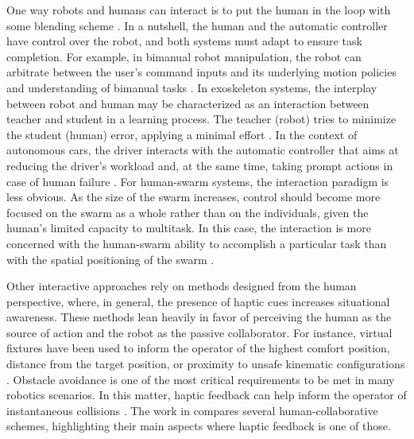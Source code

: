 One way robots and humans can interact is to put the human in the loop with some blending scheme \cite{amirshirzad2019}. In a nutshell, the human and the automatic controller have control over the robot, and both systems must adapt to ensure task completion. For example, in bimanual robot manipulation, the robot can arbitrate between the user's command inputs and its underlying motion policies and understanding of bimanual tasks \cite{rakita2019, xi2019}. In exoskeleton systems, the interplay between robot and human may be characterized as an interaction between teacher and student in a learning process. The teacher (robot) tries to minimize the student (human) error, applying a minimal effort \cite{bao2020, santos2019}. In the context of autonomous cars, the driver interacts with the automatic controller that aims at reducing the driver's workload and, at the same time, taking prompt actions in case of human failure \cite{huang2019, lu2019}. For human-swarm systems, the interaction paradigm is less obvious. As the size of the swarm increases, control should become more focused on the swarm as a whole rather than on the individuals, given the human's limited capacity to multitask. In this case, the interaction is more concerned with the human-swarm ability to accomplish a particular task than with the spatial positioning of the swarm \cite{ashcraft2019, nam2019}. 

Other interactive approaches rely on methods designed from the human perspective, where, in general, the presence of haptic cues increases situational awareness. These methods lean heavily in favor of perceiving the human as the source of action and the robot as the passive collaborator. For instance, virtual fixtures have been used to inform the operator of the highest comfort position, distance from the target position, or proximity to unsafe kinematic configurations \cite{rahal2020, abi2020}. Obstacle avoidance is one of the most critical requirements to be met in many robotics scenarios. In this matter, haptic feedback can help inform the operator of instantaneous collisions \cite{parsa2020, masone2018}. The work in \cite{franchi2017} compares several human-collaborative schemes, highlighting their main aspects where haptic feedback is one of those.

